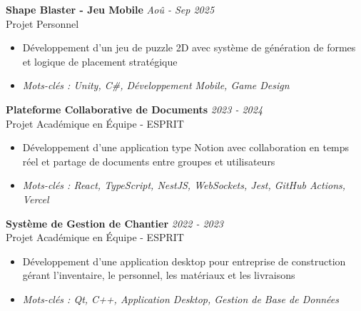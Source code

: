 \documentclass[11pt,a4paper]{article}
\begin{document}

\textbf{Shape Blaster - Jeu Mobile} \hfill \textit{Aoû - Sep 2025}\\[-2pt]
Projet Personnel\\[-5pt]
\begin{itemize}[leftmargin=8pt,itemsep=0pt,topsep=1pt]
  \item Développement d'un jeu de puzzle 2D avec système de génération de formes et logique de placement stratégique
  \item[] \textit{\footnotesize Mots-clés : Unity, C\#, Développement Mobile, Game Design}
\end{itemize}\vspace{2pt}

\textbf{Plateforme Collaborative de Documents} \hfill \textit{2023 - 2024}\\[-2pt]
Projet Académique en Équipe - ESPRIT\\[-5pt]
\begin{itemize}[leftmargin=8pt,itemsep=0pt,topsep=1pt]
  \item Développement d'une application type Notion avec collaboration en temps réel et partage de documents entre groupes et utilisateurs
  \item[] \textit{\footnotesize Mots-clés : React, TypeScript, NestJS, WebSockets, Jest, GitHub Actions, Vercel}
\end{itemize}\vspace{2pt}

\textbf{Système de Gestion de Chantier} \hfill \textit{2022 - 2023}\\[-2pt]
Projet Académique en Équipe - ESPRIT\\[-5pt]
\begin{itemize}[leftmargin=8pt,itemsep=0pt,topsep=1pt]
  \item Développement d'une application desktop pour entreprise de construction gérant l'inventaire, le personnel, les matériaux et les livraisons
  \item[] \textit{\footnotesize Mots-clés : Qt, C++, Application Desktop, Gestion de Base de Données}
\end{itemize}\vspace{2pt}
\end{document}
